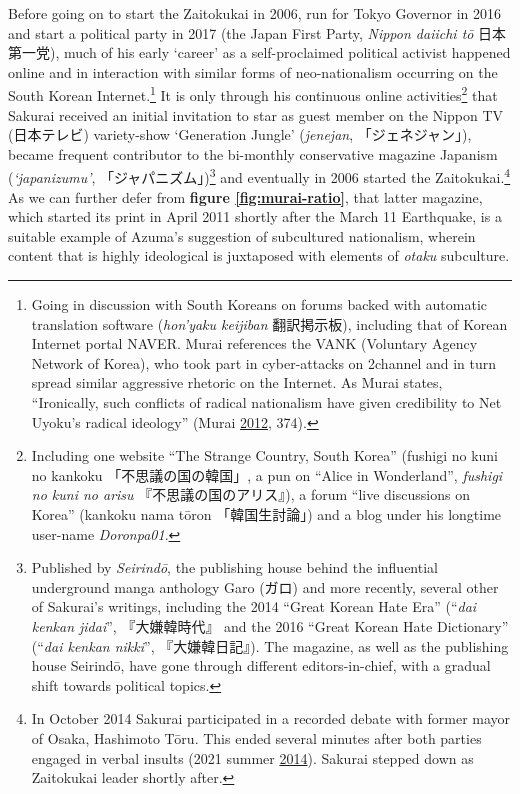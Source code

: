 \documentclass[10pt,british,A4paper,,openany]{memoir}
\begin{document}
Before going on to start the Zaitokukai in 2006, run for Tokyo Governor
in 2016 and start a political party in 2017 (the Japan First Party,
\emph{Nippon daiichi tō} 日本第一党), much of his early `career' as a
self-proclaimed political activist happened online and in interaction
with similar forms of neo-nationalism occurring on the South Korean
Internet.\footnote{Going in discussion with South Koreans on forums
  backed with automatic translation software (\emph{hon'yaku keijiban}
  翻訳掲示板), including that of Korean Internet portal NAVER. Murai
  references the VANK (Voluntary Agency Network of Korea), who took part
  in cyber-attacks on 2channel and in turn spread similar aggressive
  rhetoric on the Internet. As Murai states, ``Ironically, such
  conflicts of radical nationalism have given credibility to Net Uyoku's
  radical ideology'' (Murai
  \protect\hyperlink{ref-murai_net_2012}{2012}, 374).} It is only
through his continuous online activities\footnote{Including one website
  ``The Strange Country, South Korea'' (fushigi no kuni no kankoku
  「不思議の国の韓国」, a pun on ``Alice in Wonderland'', \emph{fushigi
  no kuni no arisu} 『不思議の国のアリス』), a forum ``live discussions
  on Korea'' (kankoku nama tōron 「韓国生討論」) and a blog under his
  longtime user-name \emph{Doronpa01}.} that Sakurai received an initial
invitation to star as guest member on the Nippon TV (日本テレビ)
variety-show `Generation Jungle' (\emph{jenejan}, 「ジェネジャン」),
became frequent contributor to the bi-monthly conservative magazine
Japanism (\emph{`japanizumu'}, 「ジャパニズム」)\footnote{Published by
  \emph{Seirindō}, the publishing house behind the influential
  underground manga anthology Garo (ガロ) and more recently, several
  other of Sakurai's writings, including the 2014 ``Great Korean Hate
  Era'' (``\emph{dai kenkan jidai}'', 『大嫌韓時代』 and the 2016
  ``Great Korean Hate Dictionary'' (``\emph{dai kenkan nikki}'',
  『大嫌韓日記』). The magazine, as well as the publishing house
  Seirindō, have gone through different editors-in-chief, with a gradual
  shift towards political topics.} and eventually in 2006 started the
Zaitokukai.\footnote{In October 2014 Sakurai participated in a recorded
  debate with former mayor of Osaka, Hashimoto Tōru. This ended several
  minutes after both parties engaged in verbal insults (2021 summer
  \protect\hyperlink{ref-2021_summer_vs_2014}{2014}). Sakurai stepped
  down as Zaitokukai leader shortly after.} As we can further defer from
\textbf{figure \ref{fig:murai-ratio}}, that latter magazine, which
started its print in April 2011 shortly after the March 11 Earthquake,
is a suitable example of Azuma's suggestion of subcultured nationalism,
wherein content that is highly ideological is juxtaposed with elements
of \emph{otaku} subculture.
\end{document}
